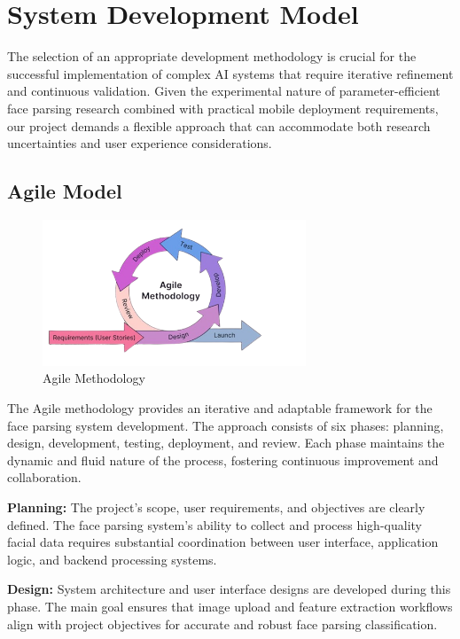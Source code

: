 \documentclass[12pt,a4paper]{report}
\begin{document}
\section{System Development Model}

The selection of an appropriate development methodology is crucial for the successful implementation of complex AI systems that require iterative refinement and continuous validation. Given the experimental nature of parameter-efficient face parsing research combined with practical mobile deployment requirements, our project demands a flexible approach that can accommodate both research uncertainties and user experience considerations.

\subsection{Agile Model}

\begin{figure}[H]
\centering
\includegraphics[width=0.7\textwidth]{figures/agile.png}
\caption{Agile Methodology}
\label{fig:agile_methodology}
\end{figure}

The Agile methodology provides an iterative and adaptable framework for the face parsing system development. The approach consists of six phases: planning, design, development, testing, deployment, and review. Each phase maintains the dynamic and fluid nature of the process, fostering continuous improvement and collaboration.

\textbf{Planning:} The project's scope, user requirements, and objectives are clearly defined. The face parsing system's ability to collect and process high-quality facial data requires substantial coordination between user interface, application logic, and backend processing systems.

\textbf{Design:} System architecture and user interface designs are developed during this phase. The main goal ensures that image upload and feature extraction workflows align with project objectives for accurate and robust face parsing classification.
\end{document}
